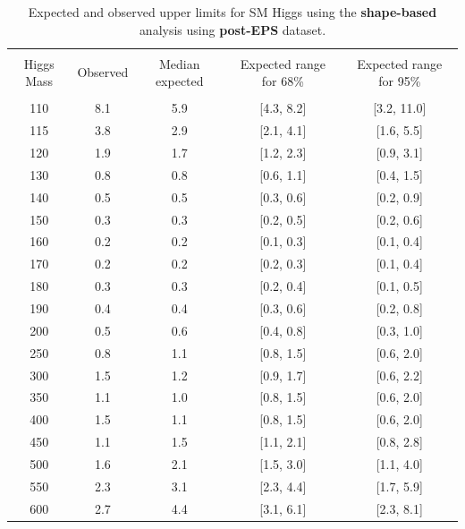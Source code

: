 \begin{table}[hbp!]
\begin{center}
\begin{tabular}{c c c c c}
\hline
\vspace{-3mm} && \\
 Higgs Mass   & Observed & Median expected & Expected range for 68\% & Expected range for 95\%   \\
\vspace{-3mm} && \\
\hline
110 & 8.1 & 5.9 & [4.3, 8.2] & [3.2, 11.0] \\
115 & 3.8 & 2.9 & [2.1, 4.1] & [1.6, 5.5] \\
120 & 1.9 & 1.7 & [1.2, 2.3] & [0.9, 3.1] \\
130 & 0.8 & 0.8 & [0.6, 1.1] & [0.4, 1.5] \\
140 & 0.5 & 0.5 & [0.3, 0.6] & [0.2, 0.9] \\
150 & 0.3 & 0.3 & [0.2, 0.5] & [0.2, 0.6] \\
160 & 0.2 & 0.2 & [0.1, 0.3] & [0.1, 0.4] \\
170 & 0.2 & 0.2 & [0.2, 0.3] & [0.1, 0.4] \\
180 & 0.3 & 0.3 & [0.2, 0.4] & [0.1, 0.5] \\
190 & 0.4 & 0.4 & [0.3, 0.6] & [0.2, 0.8] \\
200 & 0.5 & 0.6 & [0.4, 0.8] & [0.3, 1.0] \\
250 & 0.8 & 1.1 & [0.8, 1.5] & [0.6, 2.0] \\
300 & 1.5 & 1.2 & [0.9, 1.7] & [0.6, 2.2] \\
350 & 1.1 & 1.0 & [0.8, 1.5] & [0.6, 2.0] \\
400 & 1.5 & 1.1 & [0.8, 1.5] & [0.6, 2.0] \\
450 & 1.1 & 1.5 & [1.1, 2.1] & [0.8, 2.8] \\
500 & 1.6 & 2.1 & [1.5, 3.0] & [1.1, 4.0] \\
550 & 2.3 & 3.1 & [2.3, 4.4] & [1.7, 5.9] \\
600 & 2.7 & 4.4 & [3.1, 6.1] & [2.3, 8.1] \\
\hline
\end{tabular}
\caption{Expected and observed upper limits for SM Higgs using the
  {\bf shape-based} analysis using {\bf post-EPS} dataset.}
\label{tab:mvabase_uls_posteps}
\end{center}
\end{table}
